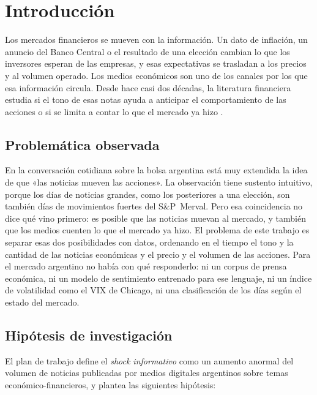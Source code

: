 \chapter{Introducción}
\label{cap:introduccion}

Los mercados financieros se mueven con la información. Un dato de inflación, un anuncio del
Banco Central o el resultado de una elección cambian lo que los inversores esperan de las
empresas, y esas expectativas se trasladan a los precios y al volumen operado. Los medios
económicos son uno de los canales por los que esa información circula. Desde hace casi dos
décadas, la literatura financiera estudia si el tono de esas notas ayuda a anticipar el
comportamiento de las acciones o si se limita a contar lo que el mercado ya hizo
\citep{tetlock2007,garcia2013,verma2026}.

\section{Problemática observada}

En la conversación cotidiana sobre la bolsa argentina está muy extendida la idea de que «las
noticias mueven las acciones». La observación tiene sustento intuitivo, porque los días de
noticias grandes, como los posteriores a una elección, son también días de movimientos fuertes
del S\&P~Merval. Pero esa coincidencia no dice qué vino primero: es posible que las noticias
muevan al mercado, y también que los medios cuenten lo que el mercado ya hizo. El problema de
este trabajo es separar esas dos posibilidades con datos, ordenando en el tiempo el tono y la
cantidad de las noticias económicas y el precio y el volumen de las acciones. Para el mercado
argentino no había con qué responderlo: ni un corpus de prensa económica, ni un modelo de
sentimiento entrenado para ese lenguaje, ni un índice de volatilidad como el VIX de Chicago, ni
una clasificación de los días según el estado del mercado.

\section{Hipótesis de investigación}

El plan de trabajo define el \textit{shock informativo} como un aumento anormal del volumen
de noticias publicadas por medios digitales argentinos sobre temas económico-financieros, y
plantea las siguientes hipótesis:

